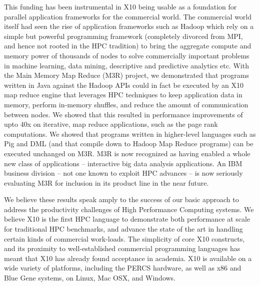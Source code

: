 This funding has been instrumental in X10 being usable as a foundation
for parallel application frameworks for the commercial world. The
commercial world itself had seen the rise of application frameworks
such as Hadoop which rely on a simple but powerful programming
framework (completely divorced from MPI, and hence not rooted in the
HPC tradition) to bring the aggregate compute and memory power of
thousands of nodes to solve commercially important problems in machine
learning, data mining, descriptive and predictive analytics etc. With
the Main Memory Map Reduce (M3R) project, we demonstrated that
programs written in Java against the Hadoop APIs could in fact be
executed by an X10 map reduce engine that leverages HPC techniques to
keep application data in memory, perform in-memory shuffles, and
reduce the amount of communication between nodes. We showed that this
resulted in performance improvements of upto 40x on iterative, map
reduce applications, such as the page rank computations. We showed
that programs written in higher-level languages such as Pig and DML
(and that compile down to Hadoop Map Reduce programs) can be executed
unchanged on M3R.  M3R is now recognized as having enabled a whole new
class of applications -- interactive big data analysis applications.
An IBM business division -- not one known to exploit HPC advances --
is now seriously evaluating M3R for inclusion in its product line in
the near future. 

We believe these results speak amply to the success of our basic
approach to address the productivity challenges of High Performance
Computing systems. We believe X10 is the first HPC language to
demonstrate both performance at scale for traditional HPC benchmarks,
and advance the state of the art in handling certain kinds of
commercial work-loads. The simplicity of core X10 constructs, and its
proximity to well-established commercial programming languages has
meant that X10 has already found acceptance in academia. X10 is
available on a wide variety of platforms, including the PERCS
hardware, as well as x86 and Blue Gene systems, on Linux, Mac OSX, and
Windows. 
